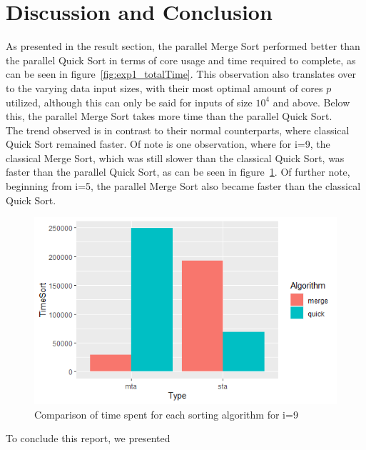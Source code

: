 \documentclass[twocolumn]{article}
\begin{document}
\section{Discussion and Conclusion}
As presented in the result section, the parallel Merge Sort performed better than the parallel Quick Sort in terms of core usage and time required to complete, as can be seen in figure~\ref{fig:exp1_totalTime}. This observation also translates over to the varying data input sizes, with their most optimal amount of cores $p$ utilized, although this can only be said for inputs of size $10^4$ and above. Below this, the parallel Merge Sort takes more time than the parallel Quick Sort.\\
The trend observed is in contrast to their normal counterparts, where classical Quick Sort remained faster. Of note is one observation, where for i=9, the classical Merge Sort, which was still slower than the classical Quick Sort, was faster than the parallel Quick Sort, as can be seen in figure~\ref{fig:exp2_i9}. Of further note, beginning from i=5, the parallel Merge Sort also became faster than the classical Quick Sort.

\begin{figure}[h]
	\includegraphics[scale=0.5]{./figures/exp2_comparison_i9_sort.png}
	\centering
	\caption{Comparison of time spent for each sorting algorithm for i=9}
	\label{fig:exp2_i9}
\end{figure}

To conclude this report, we presented 
\end{document}
